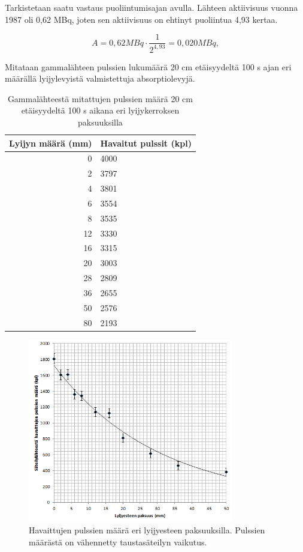 \documentclass[a4paper,11pt]{article}
\begin{document}
Tarkistetaan saatu vastaus puoliintumisajan avulla. Lähteen aktiivisuus vuonna 1987 oli 0,62 MBq, joten sen aktiivisuus on ehtinyt puoliintua 4,93 kertaa. 

\begin{equation}
  A = 0,62 {MBq} \cdot \frac{1}{2^{4,93}} = 0,020 {MBq} ,
\end{equation}

Mitataan gammalähteen pulssien lukumäärä 20 cm etäisyydeltä 100 s ajan eri määrällä lyijylevyistä valmistettuja absorptiolevyjä. 

\begin{table}[H]
\begin{center}
\caption{Gammalähteestä mitattujen pulssien määrä 20 cm etäisyydeltä 100 s aikana eri lyijykerroksen paksuuksilla}
\begin{tabular}{ | r | l | }
  \hline
Lyijyn määrä (mm) & Havaitut pulssit (kpl) \\ \hline
0 & 4000 \\ \hline
2 & 3797 \\ \hline
4 & 3801 \\ \hline
6 & 3554 \\ \hline
8 & 3535 \\ \hline
12 & 3330 \\ \hline
16 & 3315 \\ \hline
20 & 3003 \\ \hline
28 & 2809 \\ \hline
36 & 2655 \\ \hline
50 & 2576 \\ \hline
80 & 2193 \\ \hline

\end{tabular}
\end{center}
\end{table}

\begin{figure}[H]
\centering \includegraphics[width=0.8\textwidth]{lyijyeste}
\caption{Havaittujen pulssien määrä eri lyijyesteen paksuuksilla. Pulssien määrästä on vähennetty taustasäteilyn vaikutus. \label{lyijyeste}}
\end{figure}
\end{document}
